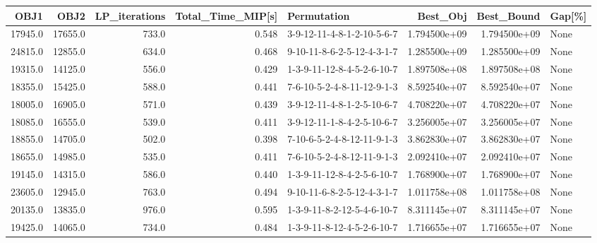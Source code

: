 \begin{tabular}{rrrrlrrl}
\toprule
    OBJ1 &     OBJ2 &  LP\_iterations &  Total\_Time\_MIP[s] &                 Permutation &      Best\_Obj &    Best\_Bound & Gap[\%] \\
\midrule
 17945.0 &  17655.0 &          733.0 &              0.548 &  3-9-12-11-4-8-1-2-10-5-6-7 &  1.794500e+09 &  1.794500e+09 &   None \\
 24815.0 &  12855.0 &          634.0 &              0.468 &  9-10-11-8-6-2-5-12-4-3-1-7 &  1.285500e+09 &  1.285500e+09 &   None \\
 19315.0 &  14125.0 &          556.0 &              0.429 &  1-3-9-11-12-8-4-5-2-6-10-7 &  1.897508e+08 &  1.897508e+08 &   None \\
 18355.0 &  15425.0 &          588.0 &              0.441 &  7-6-10-5-2-4-8-11-12-9-1-3 &  8.592540e+07 &  8.592540e+07 &   None \\
 18005.0 &  16905.0 &          571.0 &              0.439 &  3-9-12-11-4-8-1-2-5-10-6-7 &  4.708220e+07 &  4.708220e+07 &   None \\
 18085.0 &  16555.0 &          539.0 &              0.411 &  3-9-12-11-1-8-4-2-5-10-6-7 &  3.256005e+07 &  3.256005e+07 &   None \\
 18855.0 &  14705.0 &          502.0 &              0.398 &  7-10-6-5-2-4-8-12-11-9-1-3 &  3.862830e+07 &  3.862830e+07 &   None \\
 18655.0 &  14985.0 &          535.0 &              0.411 &  7-6-10-5-2-4-8-12-11-9-1-3 &  2.092410e+07 &  2.092410e+07 &   None \\
 19145.0 &  14315.0 &          586.0 &              0.440 &  1-3-9-11-12-8-4-2-5-6-10-7 &  1.768900e+07 &  1.768900e+07 &   None \\
 23605.0 &  12945.0 &          763.0 &              0.494 &  9-10-11-6-8-2-5-12-4-3-1-7 &  1.011758e+08 &  1.011758e+08 &   None \\
 20135.0 &  13835.0 &          976.0 &              0.595 &  1-3-9-11-8-2-12-5-4-6-10-7 &  8.311145e+07 &  8.311145e+07 &   None \\
 19425.0 &  14065.0 &          734.0 &              0.484 &  1-3-9-11-8-12-4-5-2-6-10-7 &  1.716655e+07 &  1.716655e+07 &   None \\
\bottomrule
\end{tabular}
